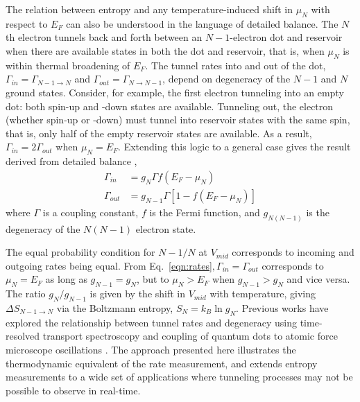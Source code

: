 \documentclass[twocolumn,showpacs,amsmath,amssymb,prl,aps,superscriptaddress]{revtex4-1}
\begin{document}
The relation between entropy and any temperature-induced shift in $\mu_{N}$ with respect to $E_F$ can also be understood in the language of detailed balance.  The $N$th electron tunnels back and forth between an $N-1$-electron dot and reservoir when there are available states in both the dot and reservoir, that is, when $\mu_{N}$ is within thermal broadening of $E_F$.  The tunnel rates into and out of the dot, $\Gamma_{in}=\Gamma_{N-1\rightarrow N}$ and $\Gamma_{out}=\Gamma_{N\rightarrow N-1}$, depend on degeneracy of the $N-1$ and $N$ ground states. Consider, for example, the first electron tunneling into an empty dot: both spin-up and -down states are available.  Tunneling out, the electron (whether spin-up or -down) must tunnel into reservoir states with the same spin, that is, only half of the empty reservoir states are available.  As a result, $\Gamma_{in} = 2\Gamma_{out}$ when $\mu_{N}=E_F$.  Extending this logic to a general case gives the result derived from detailed balance \cite{Gustavsson2009, Beenakker1991}, 
%
\begin{align}
	\Gamma_{in} &=  g_{N} \Gamma f(E_F - \mu_{N}) \nonumber \\
	\Gamma_{out} &= g_{N-1} \Gamma [1 - f(E_F - \mu_{N})] \label{eqn:rates}
\end{align}
%
where $\Gamma$ is a coupling constant, $f$ is the Fermi function, and $g_{N(N-1)}$ is the degeneracy of the $N(N-1)$ electron state.

The equal probability condition for $N-1/N$ at $V_{mid}$ corresponds to  incoming and outgoing rates being equal.  From Eq.~\ref{eqn:rates}$, \Gamma_{in} = \Gamma_{out}$ corresponds to $\mu_{N} = E_F$ as long as $g_{N-1}=g_{N}$, but to $\mu_{N} > E_F$ when $g_{N-1} > g_{N}$ and vice versa.   The ratio $g_{N}/g_{N-1}$ is given by the shift in $V_{mid}$ with temperature, giving $\Delta S_{N-1\rightarrow N}$ via the Boltzmann entropy, $S_{N}=k_{B} \ln{g_N}$. Previous works have explored the relationship between tunnel rates and degeneracy using time-resolved transport spectroscopy and coupling of quantum dots to atomic force microscope oscillations \cite{Cockins2010, Bennett2010, Beckel2014, Hofmann2016}. The approach presented here illustrates the thermodynamic equivalent of the rate measurement, and extends entropy measurements to a wide set of applications where tunneling processes may not be possible to observe in real-time.
\end{document}
